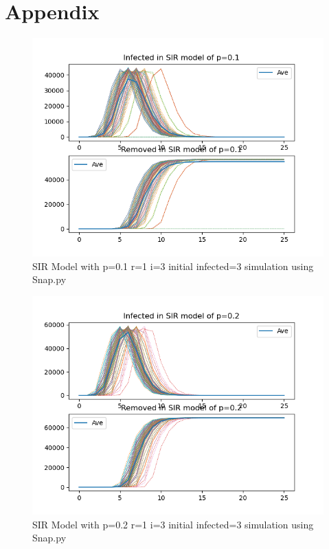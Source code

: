 \documentclass{subfile}
\begin{document}
  \section{Appendix}
  \begin{figure}[h!]
  \includegraphics[scale=0.8]{sirp01r1i3s3}
  \caption[SIR p=0.1,r=1,i=3,init infected=3]{SIR Model with p=0.1 r=1 i=3 initial infected=3 simulation using Snap.py}
  \end{figure}
  \begin{figure}
  \includegraphics[scale=0.8]{sirp02r1i3s3}
  \caption[SIR p=0.2,r=1,i=3,init infected=3]{SIR Model with p=0.2 r=1 i=3 initial infected=3 simulation using Snap.py}
  \end{figure}
\end{document}
